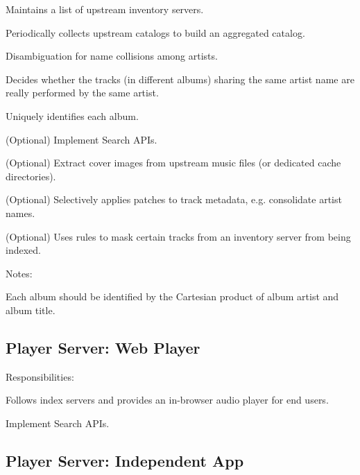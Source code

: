 \documentclass[a4paper,11pt]{article}
\begin{document}
\begin{compactitem}
	\item Maintains a list of upstream inventory servers.
	\item Periodically collects upstream catalogs to build an aggregated catalog.
	\item Disambiguation for name collisions among artists.
	\item Decides whether the tracks (in different albums) sharing the same artist name are really performed by the same artist.
	\item Uniquely identifies each album.
    \item (Optional) Implement Search APIs.
    \item (Optional) Extract cover images from upstream music files (or dedicated cache directories).
	\item (Optional) Selectively applies patches to track metadata, e.g. consolidate artist names.
	\item (Optional) Uses rules to mask certain tracks from an inventory server from being indexed.
\end{compactitem}

Notes:

\begin{compactitem}
	\item Each album should be identified by the Cartesian product of album artist and album title.
\end{compactitem}














\subsection{Player Server: Web Player}

Responsibilities:

\begin{compactitem}
	\item Follows index servers and provides an in-browser audio player for end users.
    \item Implement Search APIs.
\end{compactitem}

\subsection{Player Server: Independent App}
\end{document}
